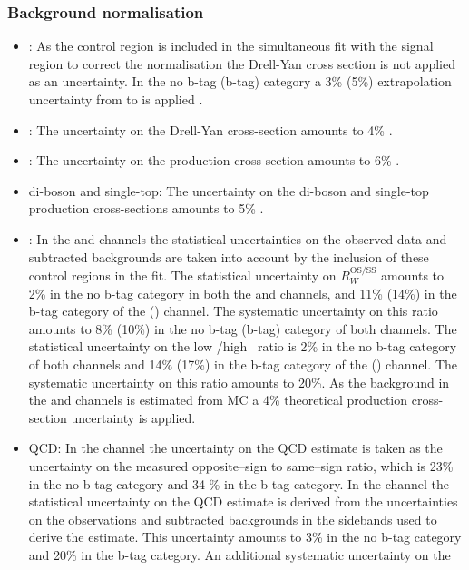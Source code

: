 \subsubsection*{Background normalisation}
\begin{itemize}
\setlength{\itemsep}{-\baselineskip}
\item \Ztautau: As the \Zmm control region is included in the simultaneous
fit with the signal region to correct the \Ztautau normalisation
the Drell-Yan cross section is not applied as an uncertainty. In the no b-tag (b-tag) category a 3\% (5\%)
extrapolation uncertainty from \Zmm to \Ztautau is applied \cite{CMS-PAS-HIG-16-037}.
\item \Zellell: The uncertainty on the Drell-Yan cross-section
amounts to 4\% \cite{CMS-PAS-HIG-16-037}.
\item \ttbar: The uncertainty on the \ttbar production cross-section amounts
to 6\% \cite{CMS-PAS-HIG-16-037}.
\item di-boson and single-top: The uncertainty on the di-boson and
single-top production cross-sections amounts to 5\% \cite{CMS-PAS-HIG-16-037}.
\item \Wjets: In the \mutau and \etau channels the statistical uncertainties
on the observed data and subtracted backgrounds are taken into account by
the inclusion of these control regions in the fit. The statistical
uncertainty on $R_{W}^{\text{OS/SS}}$ amounts to 2\% in the no b-tag
category in both the \etau and \mutau channels, and 11\% (14\%) in the b-tag
category of the \mutau (\etau) channel. The systematic uncertainty on
this ratio amounts to 8\% (10\%) in the no b-tag (b-tag) category of both channels.
The statistical uncertainty on the low \mT/high \mT~ratio is 2\% in the no b-tag
category of both channels and 14\% (17\%) in the b-tag category of the \mutau (\etau) channel.
The systematic uncertainty on this ratio amounts to 20\%. As the \Wjets background
in the \tautau and \emu channels is estimated from \ac{MC} a 4\% theoretical
production cross-section uncertainty is applied.
\item QCD: In the \emu channel the uncertainty on the QCD estimate
is taken as the uncertainty on the measured opposite--sign to same--sign
ratio, which is 23\% in the no b-tag category and 34 \% in the b-tag category. In the
\tautau channel the statistical uncertainty on the QCD estimate is derived from
the uncertainties on the observations and subtracted backgrounds in the
sidebands used to derive the estimate. This uncertainty amounts to 3\% in the no b-tag
category and 20\% in the b-tag category. An additional systematic uncertainty on the

\end{itemize}
